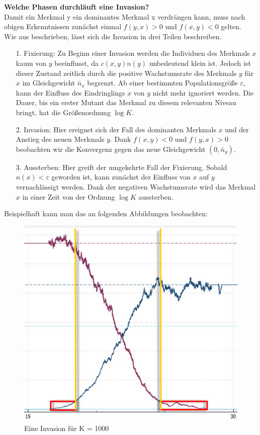 \documentclass[11pt, a4paper, german]{article}
\theoremstyle{plain}
\newcommand{\eps}{\ensuremath{\varepsilon}}
\begin{document}
	\textbf{Welche Phasen durchläuft eine Invasion?}\\
	Damit ein Merkmal y ein dominantes Merkmal x verdrängen kann, muss nach obigen Erkenntnissen zunächst einmal $ f(y,x) > 0 $ und $ f(x,y) < 0 $ gelten.\\
	Wie aus \cite{Silke} beschrieben, lässt sich die Invasion in drei Teilen beschreiben. 
	\begin{itemize}
		\item [1.] Fixierung: Zu Beginn einer Invasion werden die Individuen des Merkmals $ x $ kaum von $ y $ beeinflusst, da $ c(x,y)n(y) $ unbedeutend klein ist. Jedoch ist dieser Zustand zeitlich durch die positive Wachstumsrate des Merkmals $ y $ für $ x $ im Gleichgewicht $ \bar{n}_x $ begrenzt. Ab einer bestimmten Populationsgröße $ \eps $, kann der Einfluss des Eindringlings $ x $ von $ y $ nicht mehr ignoriert werden. Die Dauer, bis ein erster Mutant das Merkmal zu diesem relevanten Niveau bringt, hat die Größenordnung $ \log K $.
		\item [2.] Invasion: Hier ereignet sich der Fall des dominanten Merkmals $ x $ und der Anstieg des neuen Merkmals $ y $. Dank $ f(x,y) < 0 $ und $ f(y,x) > 0 $ beobachten wir die Konvergenz gegen das neue Gleichgewicht $ (0,\bar{n}_y) $.
		\item [3.] Aussterben: Hier greift der umgekehrte Fall der Fixierung. Sobald $ n(x) < \eps $ geworden ist, kann zunächst der Einfluss von $ x $ auf $ y $ vernachlässigt werden. Dank der negativen Wachstumsrate wird das Merkmal $ x $ in einer Zeit von der Ordnung $ \log K $ aussterben.
	\end{itemize}
	Beispielhaft kann man das an folgenden Abbildungen beobachten:\\
	\begin{minipage}{0.7 \textwidth}
	\begin{figure}[H]
		\centering
		\includegraphics[width=1 \linewidth]{./Pictures/Invasion2}
		\caption[Invasion]{Eine Invasion für K = 1000}
		\label{Invasionsphasen}
	\end{figure}
	\end{minipage}
\end{document}
